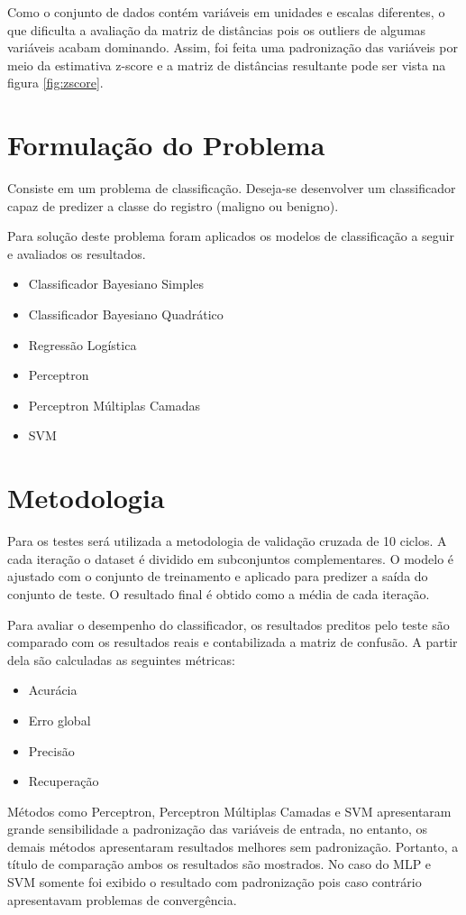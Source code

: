 \documentclass[11pt,a4paper]{article}
\numberwithin{equation}{section}
\begin{document}
Como o conjunto de dados contém variáveis em unidades e escalas diferentes, o que dificulta a avaliação da matriz de distâncias pois os outliers de algumas variáveis acabam dominando. Assim, foi feita uma padronização das variáveis por meio da estimativa z-score e a matriz de distâncias resultante pode ser vista na figura \ref{fig:zscore}.

\section{Formulação do Problema}
Consiste em um problema de classificação. Deseja-se desenvolver um classificador capaz de predizer a classe do registro (maligno ou benigno).

Para solução deste problema foram aplicados os modelos de classificação a seguir e avaliados os resultados.

\begin{itemize}
\item Classificador Bayesiano Simples
\item Classificador Bayesiano Quadrático
\item Regressão Logística
\item Perceptron
\item Perceptron Múltiplas Camadas
\item SVM
\end{itemize}

\section{Metodologia}
Para os testes será utilizada a metodologia de validação cruzada de 10 ciclos. A cada iteração o dataset é dividido em subconjuntos complementares. O modelo é ajustado com o conjunto de treinamento e aplicado para predizer a saída do conjunto de teste. O resultado final é obtido como a média de cada iteração. 

Para avaliar o desempenho do classificador, os resultados preditos pelo teste são comparado com os resultados reais e contabilizada a matriz de confusão. A partir dela são calculadas as seguintes métricas:
\begin{itemize}
\item Acurácia
\item Erro global
\item Precisão 
\item Recuperação
\end{itemize}

Métodos como Perceptron, Perceptron Múltiplas Camadas e SVM apresentaram grande sensibilidade a padronização das variáveis de entrada, no entanto, os demais métodos apresentaram resultados melhores sem padronização. Portanto, a título de comparação ambos os resultados são mostrados. No caso do MLP e SVM somente foi exibido o resultado com padronização pois caso contrário apresentavam problemas de convergência. 
\end{document}
